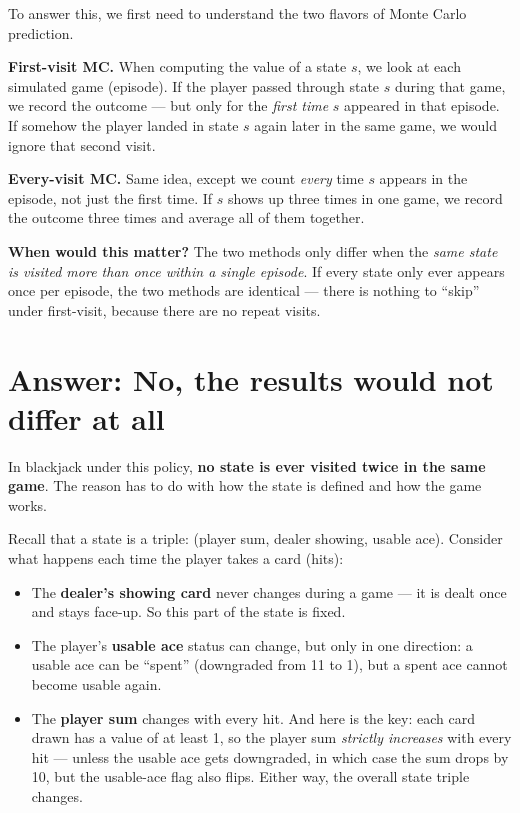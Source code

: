\documentclass[11pt]{article}
\begin{document}
To answer this, we first need to understand the two flavors of Monte Carlo prediction.

\textbf{First-visit MC.} When computing the value of a state $s$, we look at each simulated game (episode). If the player passed through state $s$ during that game, we record the outcome --- but only for the \textit{first time} $s$ appeared in that episode. If somehow the player landed in state $s$ again later in the same game, we would ignore that second visit.

\textbf{Every-visit MC.} Same idea, except we count \textit{every} time $s$ appears in the episode, not just the first time. If $s$ shows up three times in one game, we record the outcome three times and average all of them together.

\textbf{When would this matter?} The two methods only differ when the \textit{same state is visited more than once within a single episode}. If every state only ever appears once per episode, the two methods are identical --- there is nothing to ``skip'' under first-visit, because there are no repeat visits.

\section*{Answer: No, the results would not differ at all}

In blackjack under this policy, \textbf{no state is ever visited twice in the same game}. The reason has to do with how the state is defined and how the game works.

Recall that a state is a triple: (player sum, dealer showing, usable ace). Consider what happens each time the player takes a card (hits):

\begin{itemize}[nosep]
    \item The \textbf{dealer's showing card} never changes during a game --- it is dealt once and stays face-up. So this part of the state is fixed.
    \item The player's \textbf{usable ace} status can change, but only in one direction: a usable ace can be ``spent'' (downgraded from 11 to 1), but a spent ace cannot become usable again.
    \item The \textbf{player sum} changes with every hit. And here is the key: each card drawn has a value of at least 1, so the player sum \textit{strictly increases} with every hit --- unless the usable ace gets downgraded, in which case the sum drops by 10, but the usable-ace flag also flips. Either way, the overall state triple changes.
\end{itemize}
\end{document}
